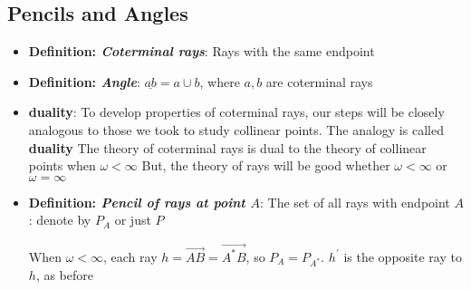 \documentclass{report}
\begin{document}
    \pagebreak 
    \subsection{Pencils and Angles}
    \begin{itemize}
        \item \textbf{Definition: \textit{Coterminal rays}}: Rays with the same endpoint
            \bigbreak \noindent 
            \begin{figure}[ht]
                \centering
                \label{fig:coterm}
            \end{figure}
            \bigbreak \noindent 
        \item \textbf{Definition: \textit{Angle}}: $\underline{ab} = a \cup b $, where $a,b$ are coterminal rays
            \bigbreak \noindent 
            \begin{figure}[ht]
                \centering
                \label{fig:ang}
            \end{figure}
            \bigbreak \noindent 
        \item \textbf{duality}: To develop properties of coterminal rays, our steps will be closely analogous to those we took to study collinear points. The analogy is called \textbf{duality}
            \bigbreak \noindent 
            The theory of coterminal rays is dual to the theory of collinear points when $\omega < \infty$
            \bigbreak \noindent 
            But, the theory of rays will be good whether $\omega < \infty$ or $\omega = \infty$
        \item \textbf{Definition: \textit{Pencil of rays at point $A$}}: The set of all rays with endpoint $A$: denote by $P_{A}$ or just $P$
            \bigbreak \noindent 
            \begin{figure}[ht]
                \centering
                \label{fig:pencil}
            \end{figure}
            \bigbreak \noindent 
            When $\omega < \infty$, each ray $h = \overrightarrow{AB} = \overrightarrow{A^{*}B}$, so $P_{A} = P_{A^{*}} $. $h^{\prime} $ is the opposite ray to $h$, as before
            \bigbreak \noindent 
            \begin{figure}[ht]
                \centering
                \label{fig:circ}
            \end{figure}
            \bigbreak \noindent 


\end{itemize}
\end{document}
